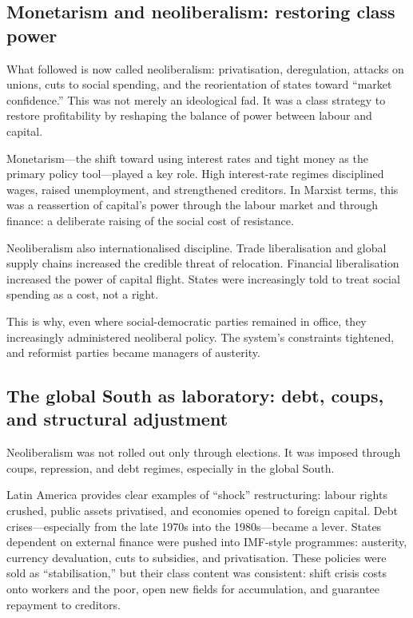 \subsection{Monetarism and neoliberalism: restoring class power}
\label{subsec:neoliberal-turn}

What followed is now called neoliberalism: privatisation, deregulation, attacks on unions, cuts to social spending,
and the reorientation of states toward ``market confidence.'' This was not merely an ideological fad. It was a class
strategy to restore profitability by reshaping the balance of power between labour and capital.\cite{HarveyNeoliberalism}

Monetarism—the shift toward using interest rates and tight money as the primary policy tool—played a key role.
High interest-rate regimes disciplined wages, raised unemployment, and strengthened creditors. In Marxist terms,
this was a reassertion of capital's power through the labour market and through finance: a deliberate raising of the
social cost of resistance.

Neoliberalism also internationalised discipline. Trade liberalisation and global supply chains increased the credible
threat of relocation. Financial liberalisation increased the power of capital flight. States were increasingly told to
treat social spending as a cost, not a right.

This is why, even where social-democratic parties remained in office, they increasingly administered neoliberal policy.
The system's constraints tightened, and reformist parties became managers of austerity.

\subsection{The global South as laboratory: debt, coups, and structural adjustment}
\label{subsec:global-south-laboratory}

Neoliberalism was not rolled out only through elections. It was imposed through coups, repression, and debt regimes,
especially in the global South.

Latin America provides clear examples of ``shock'' restructuring: labour rights crushed, public assets privatised,
and economies opened to foreign capital. Debt crises—especially from the late 1970s into the 1980s—became a lever.
States dependent on external finance were pushed into IMF-style programmes: austerity, currency devaluation,
cuts to subsidies, and privatisation.\cite{PeetUnholyTrinity} These policies were sold as ``stabilisation,'' but their class content was
consistent: shift crisis costs onto workers and the poor, open new fields for accumulation, and guarantee repayment
to creditors.

